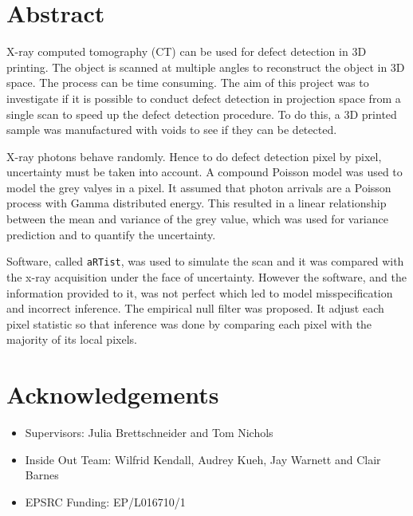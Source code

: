 \documentclass[12pt, a4paper]{memoir}
\begin{document}
\sloppy



\frontmatter
\section*{Abstract}
X-ray computed tomography (CT) can be used for defect detection in 3D printing. The object is scanned at multiple angles to reconstruct the object in 3D space. The process can be time consuming. The aim of this project was to investigate if it is possible to conduct defect detection in projection space from a single scan to speed up the defect detection procedure. To do this, a 3D printed sample was manufactured with voids to see if they can be detected.

X-ray photons behave randomly. Hence to do defect detection pixel by pixel, uncertainty must be taken into account. A compound Poisson model was used to model the grey valyes in a pixel. It assumed that photon arrivals are a Poisson process with Gamma distributed energy. This resulted in a linear relationship between the mean and variance of the grey value, which was used for variance prediction and to quantify the uncertainty.

Software, called \texttt{aRTist}, was used to simulate the scan and it was compared with the x-ray acquisition under the face of uncertainty. However the software, and the information provided to it, was not perfect which led to model misspecification and incorrect inference. The empirical null filter was proposed. It adjust each pixel statistic so that inference was done by comparing each pixel with the majority of its local pixels.

\newpage

\section*{Acknowledgements}
\begin{itemize}
	\item Supervisors: Julia Brettschneider and Tom Nichols
	\item Inside Out Team: Wilfrid Kendall, Audrey Kueh, Jay Warnett and Clair Barnes
	\item EPSRC Funding: EP/L016710/1
\end{itemize}

\newpage
\tableofcontents*
\newpage
\listoffigures
\newpage
\listoftables

\mainmatter
\end{document}
